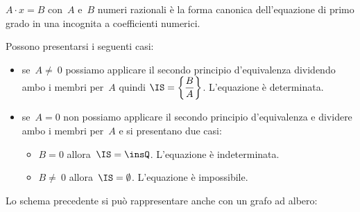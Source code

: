$A\cdot x=B$ con~$A$ e~$B$ numeri
razionali è la forma canonica dell'equazione di primo grado in una
incognita a coefficienti numerici.%

Possono presentarsi i seguenti casi:
 \begin{itemize}
 \item se~$A\neq~0$ possiamo applicare il secondo principio
d'equivalenza dividendo ambo i membri per~$A$ quindi
$\IS =\left\{\dfrac{B}{A}\right\}$. L'equazione
è determinata.

 \item se~$A=0$ non possiamo applicare il secondo principio
d'equivalenza e dividere ambo i membri per~$A$ e si
presentano due casi:

\begin{itemize}
 \item $B=0$ allora~$\IS =\insQ$. L'equazione
è indeterminata.

\item $B\neq~0$ allora~$\IS =\emptyset $.
L'equazione è impossibile.
\end{itemize}
 \end{itemize}
\pagebreak

Lo schema precedente si può rappresentare anche con un grafo ad
albero:
\begin{center}
 
\end{center}


\ovalbox{\risolvii \ref{ese:15.20}, \ref{ese:15.21}, \ref{ese:15.22}, \ref{ese:15.23}, \ref{ese:15.24}, \ref{ese:15.25}, \ref{ese:15.26}, \ref{ese:15.27}, \ref{ese:15.28}, \ref{ese:15.29},
\ref{ese:15.30}}

\ovalbox{\ref{ese:15.31}, \ref{ese:15.32}, \ref{ese:15.33}, \ref{ese:15.34}, \ref{ese:15.35}, \ref{ese:15.36}, \ref{ese:15.37}, \ref{ese:15.38}, \ref{ese:15.39},
\ref{ese:15.40}, \ref{ese:15.41}, \ref{ese:15.42}, \ref{ese:15.43}, \ref{ese:15.44}}

\ovalbox{\ref{ese:15.45}, \ref{ese:15.46}, \ref{ese:15.47}, \ref{ese:15.48}, \ref{ese:15.49},\ref{ese:15.50}}
\newpage

\cleardoublepage
